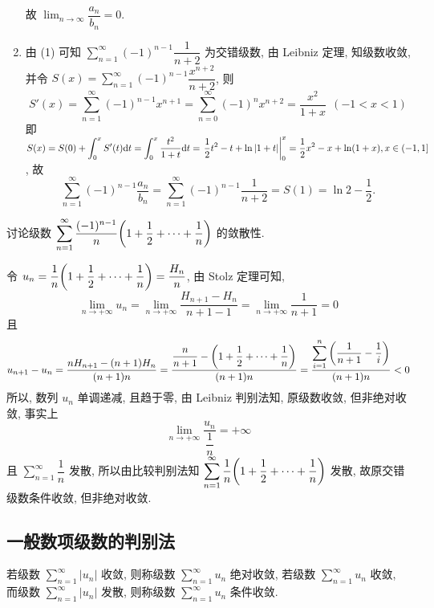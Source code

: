 \begin{solution}
\begin{enumerate}[label=(\arabic{*})]
              故 $\displaystyle\lim_{n\to\infty}\dfrac{a_n}{b_n}=0.$
        \item 由 (1) 可知 $\displaystyle\sum_{n=1}^{\infty}(-1)^{n-1}\dfrac{1}{n+2}$ 为交错级数, 由 Leibniz 定理, 知级数收敛, 并令 $S(x)=\displaystyle\sum_{n=1}^{\infty}(-1)^{n-1}\dfrac{x^{n+2}}{n+2}$, 则
              $$S'(x)=\sum_{n=1}^{\infty}(-1)^{n-1}x^{n+1}=\sum_{n=0}^{\infty}(-1)^nx^{n+2}=\dfrac{x^2}{1+x}~~(-1<x<1)$$
              即 $S(x)=S(0)+\displaystyle\int_{0}^{x}S'(t)\dd t=\int_{0}^{x}\dfrac{t^2}{1+t}\dd t=\eval{\dfrac{1}{2}t^2-t+\ln|1+t|}_{0}^{x}=\dfrac{1}{2}x^2-x+\ln(1+x),x\in(-1,1]$,
              故 $$\displaystyle\sum_{n=1}^{\infty}(-1)^{n-1}\dfrac{a_n}{b_n}=\sum_{n=1}^{\infty}(-1)^{n-1}\dfrac{1}{n+2}=S(1)=\ln 2-\dfrac{1}{2}.$$
    \end{enumerate}
\end{solution}

\begin{example}
    讨论级数 $\displaystyle \sum_{n=1}^{\infty} \dfrac{(-1)^{n-1}}{n}\qty(1+\dfrac{1}{2}+\cdots+\dfrac{1}{n})$ 的敛散性.
\end{example}
\begin{solution}
    令 $u_n=\dfrac{1}{n}\qty(1+\dfrac{1}{2}+\cdots+\dfrac{1}{n})=\dfrac{H_n}{n}$, 由 Stolz 定理可知,
    $$
    \lim_{n \to +\infty}u_n=\lim_{n \to +\infty}\dfrac{H_{n+1}-H_n}{n+1-1}=\lim_{n \to +\infty}\dfrac{1}{n+1}=0
    $$
    且
    $$
    u_{n+1}-u_n=\dfrac{nH_{n+1}-(n+1)H_n}{(n+1)n}=\dfrac{\dfrac{n}{n+1}-\qty(1+\dfrac{1}{2}+\cdots+\dfrac{1}{n})}{(n+1)n}=\dfrac{\displaystyle \sum_{i=1}^{n}\qty(\dfrac{1}{n+1}-\dfrac{1}{i})}{(n+1)n}<0
    $$
    所以, 数列 $u_n$ 单调递减, 且趋于零, 由 Leibniz 判别法知, 原级数收敛, 但非绝对收敛, 事实上
    $$
    \lim_{n \to +\infty}\dfrac{u_n}{\dfrac{1}{n}}=+\infty
    $$
    且 $\displaystyle \sum_{n=1}^{\infty} \dfrac{1}{n}$ 发散, 所以由比较判别法知 $ \displaystyle \sum_{n=1}^{\infty} \dfrac{1}{n}\qty(1+\dfrac{1}{2}+\cdots+\dfrac{1}{n}) $ 发散, 故原交错级数条件收敛, 但非绝对收敛.
\end{solution}

\subsection{一般数项级数的判别法}

\begin{definition}[绝对收敛与条件收敛]
    若级数 $\displaystyle \sum_{n=1}^{\infty}\left|u_{n}\right| $ 收敛, 则称级数 $\displaystyle \sum_{n=1}^{\infty} u_{n} $ 绝对收敛,
    若级数 $\displaystyle \sum_{n=1}^{\infty} u_{n} $ 收敛, 而级数 $\displaystyle  \sum_{n=1}^{\infty}\left|u_{n}\right| $ 发散, 则称级数 $\displaystyle \sum_{n=1}^{\infty} u_{n} $ 条件收敛.
\end{definition}

